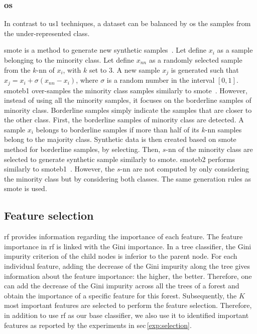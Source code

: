 \documentclass[a4paper,num-refs]{wiley-article}
\begin{document}
\subsubsection{\Acl*{os}}

In contrast to \ac{us1} techniques, a dataset can be balanced by \ac{os} the
samples from the under-represented class.

\Ac{smote} is a method to generate new synthetic
samples~\cite{chawla2002smote}. Let define $x_i$ as a sample belonging to the
minority class. Let define $x_{nn}$ as a randomly selected sample from the
$k$-\ac{nn} of $x_i$, with $k$ set to 3. A new sample $x_j$ is generated such
that $x_j = x_i + \sigma \left( x_{nn} - x_i \right)$, where $\sigma$ is a
random number in the interval $\left[0,1\right]$. \Ac{smoteb1} over-samples the
minority class samples similarly to \ac{smote}~\cite{han2005borderline}.
However, instead of using all the minority samples, it focuses on the
borderline samples of minority class.  Borderline samples simply indicate the
samples that are closer to the other class. First, the borderline samples of
minority class are detected. A sample $x_{i}$ belongs to borderline samples if
more than half of its $k$-\ac{nn} samples belong to the majority
class. Synthetic data is then created based on \ac{smote} method for borderline
samples, by selecting. Then, $s$-\ac{nn} of the minority class are selected to
generate synthetic sample similarly to \ac{smote}. \Ac{smoteb2} performs
similarly to \ac{smoteb1}~\cite{han2005borderline}.  However, the $s$-\ac{nn}
are not computed by only considering the minority class but by considering both
classes. The same generation rules as \ac{smote} is used.

\subsection{Feature selection}

\Ac{rf} provides information regarding the importance of each feature. The
feature importance in \ac{rf} is linked with the Gini importance. In a tree
classifier, the Gini impurity criterion of the child nodes is inferior to the
parent node. For each individual feature, adding the decrease of the Gini
impurity along the tree gives information about the feature importance: the
higher, the better. Therefore, one can add the decrease of the Gini impurity
across all the trees of a forest and obtain the importance of a specific
feature for this forest. Subsequently, the $K$ most important features are
selected to perform the feature selection. Therefore, in addition to use
\ac{rf} as our base classifier, we also use it to identified important features
as reported by the experiments in \acs{sec}\,\ref{exp:selection}.
\end{document}
